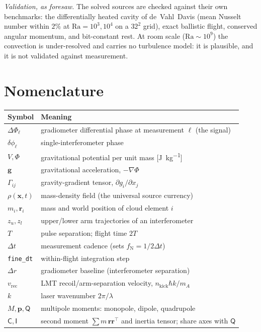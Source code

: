 \documentclass[11pt,a4paper]{article}
\theoremstyle{reqstyle}
\newcommand{\rv}{\mathbf{r}}
\newcommand{\xv}{\mathbf{x}}
\newcommand{\grad}{\nabla}
\begin{document}
\emph{Validation, as  foresaw.} The solved sources are checked against
their own benchmarks: the differentially heated cavity of de~Vahl~Davis (mean Nusselt number
within $2\%$ at $\mathrm{Ra}=10^3,10^4$ on a $32^2$ grid), exact ballistic flight, conserved
angular momentum, and bit-constant rest. At room scale ($\mathrm{Ra}\sim10^9$) the
convection is under-resolved and carries no turbulence model: it is plausible, and it is
not validated against measurement.

\section{Nomenclature}
\label{sec:nomenclature}
\small
\begin{longtable}{@{}ll@{}}
\toprule
Symbol & Meaning \\
\midrule
$\Delta\Phi_\ell$ & gradiometer differential phase at measurement $\ell$ (the signal) \\
$\delta\phi_\ell$ & single-interferometer phase \\
$V,\Phi$ & gravitational potential per unit mass [\unit{\joule\per\kilogram}] \\
$\mathbf g$ & gravitational acceleration, $-\grad\Phi$ \\
$\Gamma_{ij}$ & gravity-gradient tensor, $\partial g_i/\partial x_j$ \\
$\rho(\xv,t)$ & mass-density field (the universal source currency) \\
$m_i,\rv_i$ & mass and world position of cloud element $i$ \\
$z_u,z_l$ & upper/lower arm trajectories of an interferometer \\
$T$ & pulse separation; flight time $2T$ \\
$\Delta t$ & measurement cadence (sets $f_{\mathrm N}=1/2\Delta t$) \\
\texttt{fine\_dt} & within-flight integration step \\
$\Delta r$ & gradiometer baseline (interferometer separation) \\
$v_{\mathrm{rec}}$ & LMT recoil/arm-separation velocity, $n_{\mathrm{kick}}\hbar k/m_A$ \\
$k$ & laser wavenumber $2\pi/\lambda$ \\
$M,\mathbf p,\mathsf Q$ & multipole moments: monopole, dipole, quadrupole \\
$\mathsf C,\mathsf I$ & second moment $\sum m\,\rv\rv^{\!\top}$ and inertia tensor; share axes with $\mathsf Q$ \\

\end{longtable}
\end{document}
